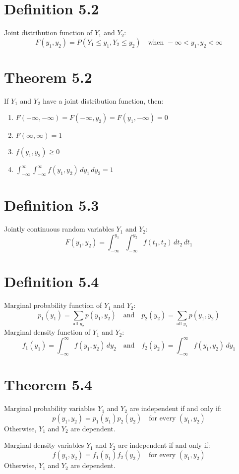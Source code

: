 \documentclass[12pt]{article}
\begin{document}
\section{Definition 5.2}
Joint distribution function of $Y_1$ and $Y_2$:
\[
F(y_1, y_2) = P(Y_1 \leq y_1, Y_2 \leq y_2) \quad \text{when } -\infty < y_1, y_2 < \infty
\]


\section{Theorem 5.2}
If $Y_1$ and $Y_2$ have a joint distribution function, then:
\begin{enumerate}
  \item $F(-\infty, -\infty) = F(-\infty, y_2) = F(y_1, -\infty) = 0$
  \item $F(\infty, \infty) = 1$
  \item $f(y_1, y_2) \geq 0$
  \item $\int_{-\infty}^{\infty} \int_{-\infty}^{\infty} f(y_1, y_2) \, dy_1 \, dy_2 = 1$
\end{enumerate}


\section{Definition 5.3}
Jointly continuous random variables $Y_1$ and $Y_2$:
\[
F(y_1, y_2) = \int_{-\infty}^{y_1} \int_{-\infty}^{y_2} f(t_1, t_2) \, dt_2 \, dt_1
\]

\section{Definition 5.4}
Marginal probability function of $Y_1$ and $Y_2$:
\[
p_1(y_1) = \sum_{\text{all } y_2} p(y_1, y_2) \quad \text{and} \quad p_2(y_2) = \sum_{\text{all } y_1} p(y_1, y_2)
\]
Marginal density function of $Y_1$ and $Y_2$:
\[
f_1(y_1) = \int_{-\infty}^{\infty} f(y_1, y_2) \, dy_2 \quad \text{and} \quad f_2(y_2) = \int_{-\infty}^{\infty} f(y_1, y_2) \, dy_1
\]

\section{Theorem 5.4}
Marginal probability variables $Y_1$ and $Y_2$ are independent if and only if:
\[
p(y_1, y_2) = p_1(y_1)p_2(y_2) \quad \text{for every } (y_1, y_2)
\]
Otherwise, $Y_1$ and $Y_2$ are dependent.

Marginal density variables $Y_1$ and $Y_2$ are independent if and only if:
\[
f(y_1, y_2) = f_1(y_1)f_2(y_2) \quad \text{for every } (y_1, y_2)
\]
Otherwise, $Y_1$ and $Y_2$ are dependent.
\end{document}
